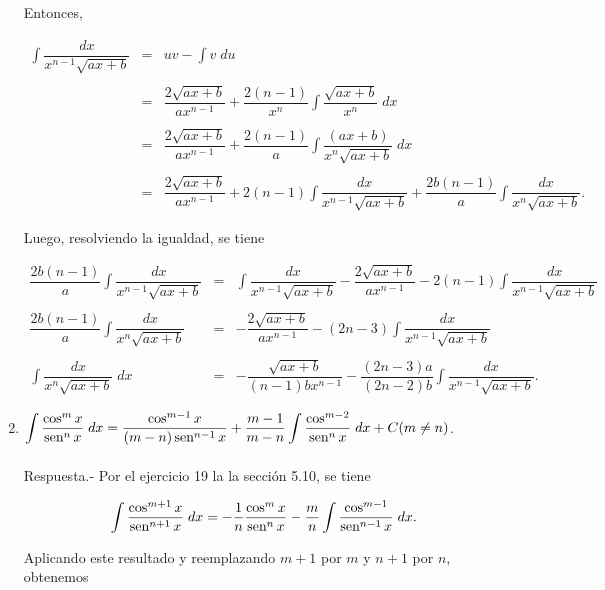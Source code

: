 \begin{enumerate}[\bfseries 1.]
	Entonces,

	$$
	\begin{array}{rcl}
	    \displaystyle\int \dfrac{dx}{x^{n-1}\sqrt{ax+b}} &=& uv-\displaystyle\int v\; du\\\\
							     &=& \dfrac{2\sqrt{ax+b}}{ax^{n-1}}+\dfrac{2(n-1)}{x^n}\displaystyle\int \dfrac{\sqrt{ax+b}}{x^n}\; dx\\\\
							     &=& \dfrac{2\sqrt{ax+b}}{ax^{n-1}}+\dfrac{2(n-1)}{a}\int \dfrac{(ax+b)}{x^n\sqrt{ax+b}}\; dx\\\\
							     &=& \dfrac{2\sqrt{ax+b}}{ax^{n-1}}+2(n-1)\displaystyle\int \dfrac{dx}{x^{n-1}\sqrt{ax+b}}+\dfrac{2b(n-1)}{a}\displaystyle\int  \dfrac{dx}{x^n\sqrt{ax+b}}.
	 \end{array}
	$$

	Luego, resolviendo la igualdad, se tiene

	$$
	\begin{array}{rcl}
	    \dfrac{2b(n-1)}{a}\displaystyle\int \dfrac{dx}{x^{n-1}\sqrt{ax+b}} &=& \displaystyle\int \dfrac{dx}{x^{n-1}\sqrt{ax+b}}-\dfrac{2\sqrt{ax+b}}{ax^{n-1}}-2(n-1)\displaystyle\int\dfrac{dx}{x^{n-1}\sqrt{ax+b}}\\\\
	    \dfrac{2b(n-1)}{a}\displaystyle\int\dfrac{dx}{x^n\sqrt{ax+b}} &=& - \dfrac{2\sqrt{ax+b}}{ax^{n-1}}-(2n-3) \displaystyle\int \dfrac{dx}{x^{n-1}\sqrt{ax+b}}\\\\
	    \displaystyle\int \dfrac{dx}{x^n\sqrt{ax+b}}\; dx &=& - \dfrac{\sqrt{ax+b}}{(n-1)bx^{n-1}}-\dfrac{(2n-3)a}{(2n-2)b}\displaystyle\int \dfrac{dx}{x^{n-1}\sqrt{ax+b}}.
	\end{array}
	$$
	\vspace{0.5cm}


    \item $\displaystyle\int \dfrac{\cos^m x}{\mathop{\mbox{\normalfont sen}}\nolimits^n x}\; dx = \dfrac{\cos^{m-1}x}{(m-n)\mathop{\mbox{\normalfont sen}}\nolimits^{n-1}x}+\dfrac{m-1}{m-n}\int \dfrac{\cos^{m-2}}{\mathop{\mbox{\normalfont sen}}\nolimits^n x}\; dx + C (m\neq n)$.\\\\
	Respuesta.-\; Por el ejercicio 19 la la sección 5.10, se tiene

	$$\int \dfrac{\cos^{m+1}x}{\mathop{\mbox{\normalfont sen}}\nolimits^{n+1}x}\; dx = -\dfrac{1}{n}\dfrac{\cos^m x}{\mathop{\mbox{\normalfont sen}}\nolimits^n x}-\dfrac{m}{n}\int \dfrac{\cos^{m-1}}{\mathop{\mbox{\normalfont sen}}\nolimits^{n-1}x}\; dx.$$ 

	Aplicando este resultado y reemplazando $m+1$ por $m$ y $n+1$ por $n$, obtenemos


\end{enumerate}

